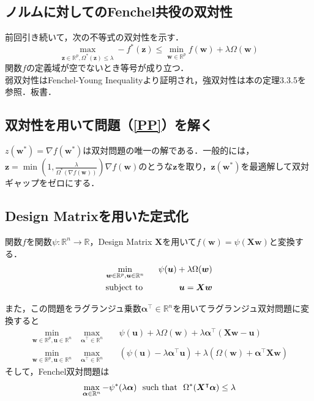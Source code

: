 \documentclass[a4paper,11pt]{jsarticle}
\numberwithin{theorem}{section}  %
\numberwithin{equation}{section} %
\newcommand{\st}{\mathop{\rm subject~to\,}\limits}
\begin{document}
\subsection{ノルムに対してのFenchel共役の双対性}
前回引き続いて，次の不等式の双対性を示す．
\begin{equation}
\max_{\bm{z} \in \mathbb{R}^p,\Omega^*(\bm{z}) \le \lambda} -f^*(\bm{z}) \le \min_{\bm{w}\in \mathbb{R}^p} f(\bm{w}) + \lambda \Omega(\bm{w})
\end{equation}
関数$f$の定義域が空でないとき等号が成り立つ．\\
弱双対性はFenchel-Young Inequalityより証明され，強双対性は本\cite{borwein}の定理3.3.5を参照．板書．

\subsection{双対性を用いて問題（\ref{PP}）を解く}
$z(\bm{w}^*) = \nabla f(\bm{w}^*)$は双対問題の唯一の解である．一般的には，$\bm{z}=\min(1,\frac{\lambda}{\Omega^*(\nabla f (\bm{w}))})\nabla f(\bm{w})$のとうな$\bm{z}$を取り，$\bm{z}(\bm{w}^*)$を最適解して双対ギャップをゼロにする．


\subsection{Design Matrixを用いた定式化}
関数$f$を関数$\psi:\mathbb{R}^n \to \mathbb{R}$，Design Matrix $\bm{X}$を用いて$f(\bm{w}) = \psi(\bm{Xw})$と変換する．
\begin{eqnarray}
\min_{\bm{w} \in \mathbb{R}^p,\bm{u} \in \mathbb{R}^n} &\,\,\,\,& \psi(\bm{u}) + \lambda \Omega(\bm{w}) \\
\st &\,\,\,\,& \bm{u} = \bm{X}\bm{w}
\end{eqnarray}

また，この問題をラグランジュ乗数$\bm{\alpha}^\intercal  \in \mathbb{R}^n$を用いてラグランジュ双対問題に変換すると
\begin{eqnarray}
\min_{\bm{w}\in\mathbb{R}^p,\bm{u} \in \mathbb{R}^n} \,\,\, \max_{\bm{\alpha}^\intercal  \in \mathbb{R}^n} && \psi(\bm{u}) + \lambda \Omega(\bm{w}) + \lambda \bm{\alpha}^\intercal  (\bm{X}\bm{w}-\bm{u}) \\
\min_{\bm{w}\in\mathbb{R}^p,\bm{u} \in \mathbb{R}^n} \,\,\, \max_{\bm{\alpha}^\intercal  \in \mathbb{R}^n} && (\psi(\bm{u}) - \lambda\bm{\alpha}^\intercal \bm{u}) + \lambda (\Omega(\bm{w}) +   \bm{\alpha}^\intercal \bm{X}\bm{w})
\end{eqnarray}
そして，Fenchel双対問題は
\begin{eqnarray}
\max_{\bm{\alpha} \in \mathbb{R}^n} -\psi^*(\lambda \bm{\alpha}) \text{\,\,\,\,such that\,\,\,\,} \Omega^*(\bm{X}^\intercal  \bm{\alpha}) \le \lambda
\end{eqnarray}
\end{document}
